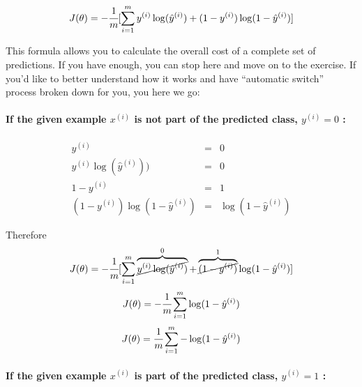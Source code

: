 \documentclass[]{article}
\let\oldparagraph\paragraph
\renewcommand{\paragraph}[1]{\oldparagraph{#1}\mbox{}}
\begin{document}
\large

\[
J( \theta) = -\cfrac{1} {m} \lbrack \sum_{i = 1}^{m} y^{(i)}\log(\hat{y}^{(i)}) + (1 - y^{(i)})\log(1 - \hat{y}^{(i)})\rbrack
\] \normalsize

This formula allows you to calculate the overall cost of a complete set
of predictions. If you have enough, you can stop here and move on to the
exercise. If you'd like to better understand how it works and have
``automatic switch'' process broken down for you, you here we go:

\hypertarget{if-the-given-example-xi-is-not-part-of-the-predicted-class-yi-0}{%
\paragraph{\texorpdfstring{If the given example \(x^{(i)}\) is not part
of the predicted class, \(y^{(i)} = 0\)
:}{If the given example x\^{}\{(i)\} is not part of the predicted class, y\^{}\{(i)\} = 0 :}}\label{if-the-given-example-xi-is-not-part-of-the-predicted-class-yi-0}}

\large

\[
\begin{matrix}
y^{(i)} & = & 0 \\
y^{(i)}\log(\hat{y}^{(i)})) & = & 0   \\
1 - y^{(i)} & = & 1 \\
(1 - y^{(i)})\log(1 - \hat{y}^{(i)}) & = & \log(1 - \hat{y}^{(i)})
\end{matrix}
\] \normalsize

Therefore \large \[
J( \theta) = -\cfrac{1} {m} \lbrack \sum_{i = 1}^{m} \overbrace{\cancel{y^{(i)}\log(\hat{y}^{(i)})}}^{0} + \overbrace{\cancel{(1 - y^{(i)})}}^{1}\log(1 - \hat{y}^{(i)})\rbrack
\] \normalsize \large \[
J( \theta) = -\cfrac{1} {m} \sum_{i = 1}^{m} \log(1 - \hat{y}^{(i)})
\] \normalsize \large \[
J( \theta) = \cfrac{1} {m} \sum_{i = 1}^{m} -\log(1 - \hat{y}^{(i)})
\] \normalsize

\hypertarget{if-the-given-example-xi-is-part-of-the-predicted-class-yi-1}{%
\paragraph{\texorpdfstring{If the given example \(x^{(i)}\) is part of
the predicted class, \(y^{(i)} = 1\)
:}{If the given example x\^{}\{(i)\} is part of the predicted class, y\^{}\{(i)\} = 1 :}}\label{if-the-given-example-xi-is-part-of-the-predicted-class-yi-1}}

\large
\end{document}

